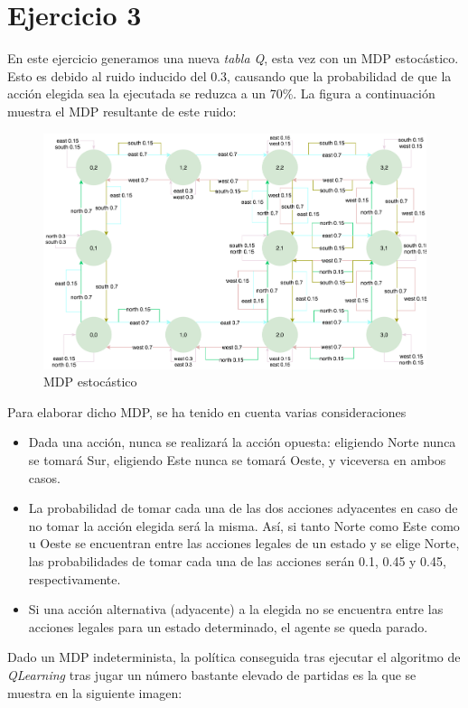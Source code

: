 \documentclass[12pt]{article}
\begin{document}
\section{Ejercicio 3}

En este ejercicio generamos una nueva \textit{tabla Q}, esta vez con un MDP estocástico. Esto es debido al ruido inducido del 0.3, causando que la probabilidad de que la acción elegida sea la ejecutada se reduzca a un 70\%. La figura a continuación muestra el MDP resultante de este ruido:

\begin{figure}[h]
    \includegraphics[width=\textwidth]{MDP_stochastic_03}
    \caption{MDP estocástico}
\end{figure}

Para elaborar dicho MDP, se ha tenido en cuenta varias consideraciones
\begin{itemize}
    \item Dada una acción, nunca se realizará la acción opuesta: eligiendo Norte nunca se tomará Sur, eligiendo Este nunca se tomará Oeste, y viceversa en ambos casos.
    \item La probabilidad de tomar cada una de las dos acciones adyacentes en caso de no tomar la acción elegida será la misma. Así, si tanto Norte como Este como u Oeste se encuentran entre las acciones legales de un estado y se elige Norte, las probabilidades de tomar cada una de las acciones serán 0.1, 0.45 y 0.45, respectivamente.
    \item Si una acción alternativa (adyacente) a la elegida no se encuentra entre las acciones legales para un estado determinado, el agente se queda parado.
\end{itemize}

Dado un MDP indeterminista, la política conseguida tras ejecutar el algoritmo de \textit{QLearning} tras jugar un número bastante elevado de partidas es la que se muestra en la siguiente imagen:
\end{document}
